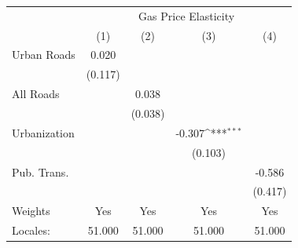 {
\def\sym#1{\ifmmode^{#1}\else\(^{#1}\)\fi}
\begin{tabular}{l*{4}{c}}
\hline\hline
            &\multicolumn{4}{c}{Gas Price Elasticity}                                               \\
            &\multicolumn{1}{c}{(1)}         &\multicolumn{1}{c}{(2)}         &\multicolumn{1}{c}{(3)}         &\multicolumn{1}{c}{(4)}         \\
\hline
Urban Roads &       0.020         &                     &                     &                     \\
            &     (0.117)         &                     &                     &                     \\
[1em]
All Roads   &                     &       0.038         &                     &                     \\
            &                     &     (0.038)         &                     &                     \\
[1em]
Urbanization&                     &                     &      -0.307\sym{***}&                     \\
            &                     &                     &     (0.103)         &                     \\
[1em]
Pub. Trans. &                     &                     &                     &      -0.586         \\
            &                     &                     &                     &     (0.417)         \\
\hline
Weights     &         Yes         &         Yes         &         Yes         &         Yes         \\
Locales:    &      51.000         &      51.000         &      51.000         &      51.000         \\
\hline\hline
\end{tabular}
}
